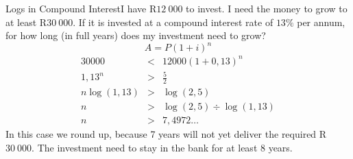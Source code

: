 \begin{wex}{Logs in Compound Interest}{I have R$12~000$ to invest.  I need the money to grow to at least R$30~000$.  If it is invested at a compound interest rate of $13\%$ per annum, for how long (in full years) does my investment need to grow? }{
\begin{equation*}
A=P(1+i)^n 
\end{equation*}
\begin{eqnarray*}
30000 &<& 12000(1+0,13)^n\\
1,13^n &>& \frac{5}{2}\\
n\log(1,13) &>& \log(2,5)\\
n &>& \log(2,5) \div \log(1,13)\\
n &>& 7,4972\ldots
\end{eqnarray*}
In this case we round up, because 7 years will not yet deliver the required R$30~000$.
The investment need to stay in the bank for at least 8 years.}\end{wex}

